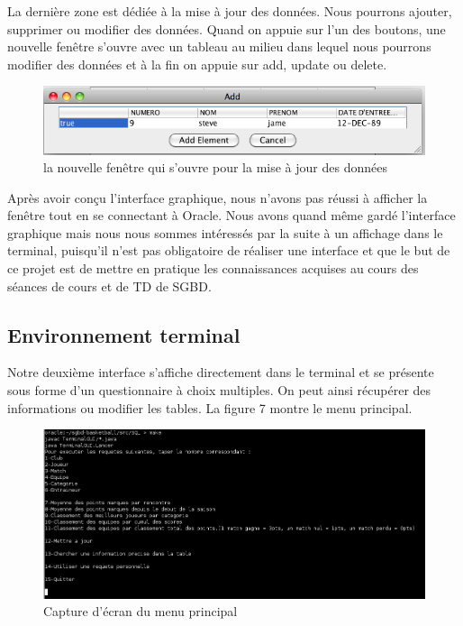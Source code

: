 \documentclass{article}
\begin{document}
La dernière zone est dédiée à la mise à jour des données. Nous pourrons ajouter, supprimer ou modifier des données. Quand on appuie sur l'un des boutons, une nouvelle fenêtre s'ouvre avec un tableau au milieu dans lequel nous pourrons modifier des données et à la fin on appuie sur add, update ou delete. \\


\begin{figure}[!h]
\centering
\includegraphics[scale = 0.4] {4.png}
\caption{la nouvelle fenêtre qui s'ouvre pour la mise à jour des données}
\end{figure}


Après avoir conçu l'interface graphique, nous n'avons pas réussi à afficher la fenêtre tout en se connectant à Oracle. Nous avons quand même gardé l'interface graphique mais nous nous sommes intéressés par la suite à un affichage dans le terminal, puisqu'il n'est pas obligatoire de réaliser une interface et que le but de ce projet est de mettre en pratique les connaissances acquises au cours des séances de cours et de TD de SGBD. 

\newpage
\subsection{Environnement terminal}

Notre deuxième interface s'affiche directement dans le terminal et se présente sous forme d'un questionnaire à choix multiples. On peut ainsi récupérer des informations ou modifier les tables. La figure 7 montre le menu principal.\\

\begin{figure}[h]
\begin{narrow}{-1.3in}{0in}
\includegraphics[scale = 0.7]{TerGUI.png}
\caption{Capture d'écran du menu principal}
\end{narrow}
\end{figure}
\end{document}
